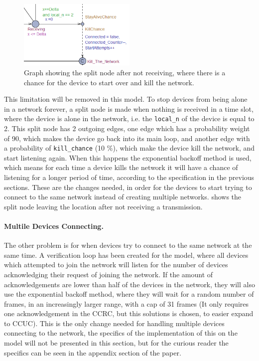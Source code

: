 \begin{figure}
    \centering
    \includegraphics[width=0.5\textwidth]{Figures/Model/Screenshot_Of_Kill.PNG} 
    \caption{Graph showing the split node after not receiving, where there is a chance for the device to start over and kill the network.}
    \label{fig:Screenshot_Of_Kill} 
    \vspace{10pt}
\end{figure}
\noindent
This limitation will be removed in this model.
To stop devices from being alone in a network forever, a split node is made when nothing is received in a time slot, where the device is alone in the network, i.e. the \texttt{local\_n} of the device is equal to 2.
This split node has 2 outgoing edges, one edge which has a probability weight of 90, which makes the device go back into its main loop, and another edge with a probability of \texttt{kill\_chance} (10 \%), which make the device kill the network, and start listening again.
When this happens the exponential backoff method is used, which means for each time a device kills the network it will have a chance of listening for a longer period of time, according to the specification in the previous sections.
These are the changes needed, in order for the devices to start trying to connect to the same network instead of creating multiple networks.
 shows the split node leaving the location after not receiving a transmission.

\paragraph{Multile Devices Connecting.}
The other problem is for when devices try to connect to the same network at the same time.
A verification loop has been created for the model, where all devices which attempted to join the network will listen for the number of devices acknowledging their request of joining the network.
If the amount of acknowledgements are lower than half of the devices in the network, they will also use the exponential backoff method, where they will wait for a random number of frames, in an increasingly larger range, with a cap of 31 frames (It only requires one acknowledgement in the CCRC, but this solutions is chosen, to easier expand to CCUC).
This is the only change needed for handling multiple devices connecting to the network, the specifics of the implementation of this on the model will not be presented in this section, but for the curious reader the specifics can be seen in the appendix section of the paper.

